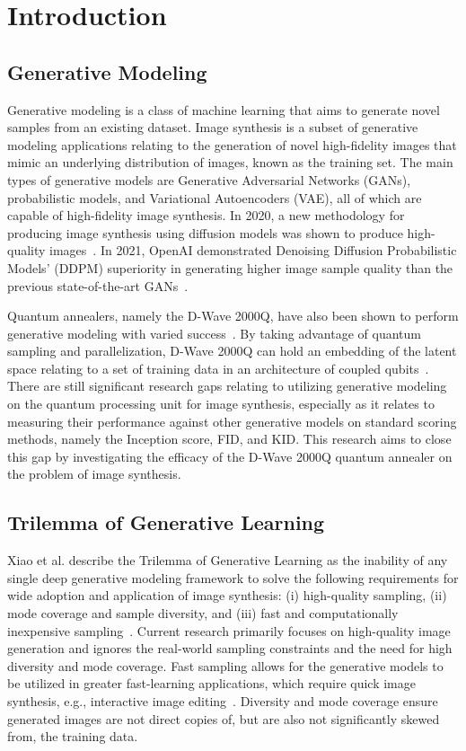 \documentclass[technologies,article,accept,pdftex,moreauthors]{Definitions/mdpi}
\begin{document}
 
\section{Introduction}
\subsection{Generative Modeling}
 
Generative modeling is a class of machine learning that aims to generate novel samples from an existing dataset. Image synthesis is a subset of generative modeling applications relating to the generation of novel high-fidelity images that mimic an underlying distribution of images, known as the training set. The main types of generative models are Generative Adversarial Networks (GANs), probabilistic models, and Variational Autoencoders (VAE), all of which are capable of high-fidelity image synthesis. In 2020, a new methodology for producing image synthesis using diffusion models was shown to produce high-quality images~\cite{ho2020denoising}. In 2021, OpenAI demonstrated Denoising Diffusion Probabilistic Models' (DDPM) superiority in generating higher image sample quality than the previous state-of-the-art GANs~\cite{dhariwal2021diffusion}.  %

Quantum annealers, namely the D-Wave 2000Q, have also been shown to perform generative modeling with varied success~\cite{Jain2020,Thulasidasan2016}. By taking advantage of quantum sampling and parallelization, D-Wave 2000Q can hold an embedding of the latent space relating to a set of training data in an architecture of coupled qubits~\cite{Amin_2018}. There are still significant research gaps relating to utilizing generative modeling on the quantum processing unit for image synthesis, especially as it relates to measuring their performance against other generative models on standard scoring methods, namely the Inception score, FID, and KID. This research aims to close this gap by investigating the efficacy of the D-Wave 2000Q quantum annealer on the problem of image synthesis.

\subsection{Trilemma of Generative Learning}
\label{trilemmaGL}
Xiao et al. describe the Trilemma of Generative Learning as the inability of any single deep generative modeling framework to solve the following requirements for wide adoption and application of image synthesis: (i) high-quality sampling, (ii) mode coverage and sample diversity, and (iii) fast and computationally inexpensive sampling~\cite{xiao2022DDGAN}. Current research primarily focuses on high-quality image generation and ignores the real-world sampling constraints and the need for high diversity and mode coverage. Fast sampling allows for the generative models to be utilized in greater fast-learning applications, which require quick image synthesis, e.g., interactive image editing~\cite{xiao2022DDGAN}. Diversity and mode coverage ensure generated images are not direct copies of, but are also not significantly skewed from, the training data.
\end{document}
